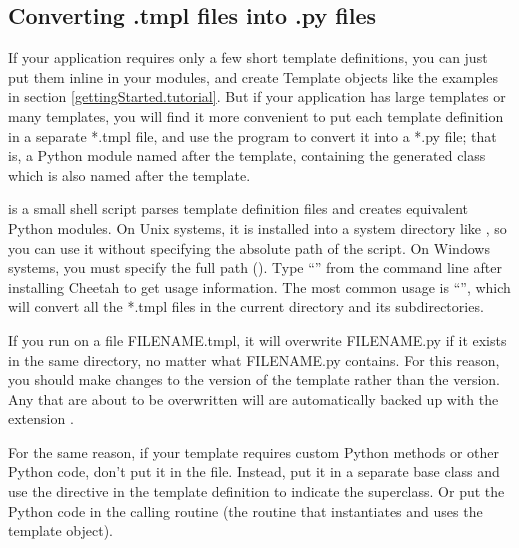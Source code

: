 \subsection{Converting .tmpl files into .py files}
\label{howWorks.tmpl2py}
\label{howWorks.cheetah-compile}

If your application requires only a few short template definitions, you can
just put them inline in your modules, and create Template objects like the
examples in section \ref{gettingStarted.tutorial}.  But if your application
has large templates or many templates, you will find it more convenient to
put each template definition in a separate *.tmpl file, and use the
 program to convert it into a *.py file; that is, a
Python module named after the template, containing the generated class
which is also named after the template.  

 is a small shell script parses template definition
files and creates equivalent Python modules.  On Unix systems, it is installed
into a system directory like , so you can use it without
specifying the absolute path of the script.  On Windows systems, you must
specify the full path (). Type
``'' from the command line after installing Cheetah to
get usage information.  The most common usage is ``'',
which will convert all the *.tmpl files in the current directory
and its subdirectories.

If you run  on a file FILENAME.tmpl, it will
overwrite FILENAME.py if it exists in the same directory, no matter what
FILENAME.py contains.  For this reason, you should make changes to the
 version of the template rather than the  version.  Any
 that are about to be overwritten will are
automatically backed up with the extension .

For the same reason, if your template requires custom Python methods or
other Python code, don't put it in the  file.  Instead, put
it in a separate base class and use the  directive in the
template definition to indicate the superclass.  Or put the Python code
in the calling routine (the routine that instantiates and uses the template
object).




